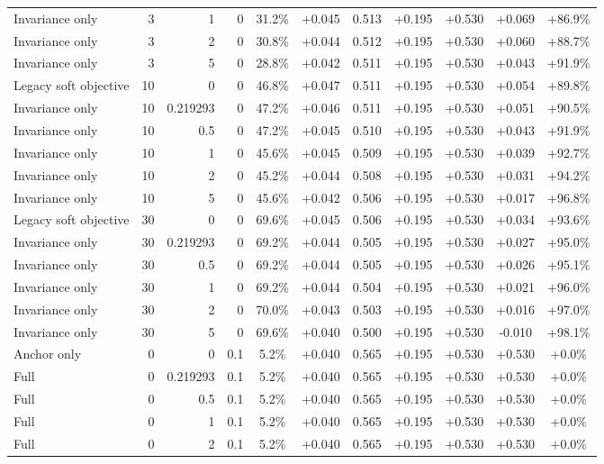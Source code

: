 \begin{table}[htbp]
\begin{tabular}{lrrrccccccc}
Invariance only & 3 & 1 & 0 & 31.2\% & +0.045 & 0.513 & +0.195 & +0.530 & +0.069 & +86.9\% \\
Invariance only & 3 & 2 & 0 & 30.8\% & +0.044 & 0.512 & +0.195 & +0.530 & +0.060 & +88.7\% \\
Invariance only & 3 & 5 & 0 & 28.8\% & +0.042 & 0.511 & +0.195 & +0.530 & +0.043 & +91.9\% \\
Legacy soft objective & 10 & 0 & 0 & 46.8\% & +0.047 & 0.511 & +0.195 & +0.530 & +0.054 & +89.8\% \\
Invariance only & 10 & 0.219293 & 0 & 47.2\% & +0.046 & 0.511 & +0.195 & +0.530 & +0.051 & +90.5\% \\
Invariance only & 10 & 0.5 & 0 & 47.2\% & +0.045 & 0.510 & +0.195 & +0.530 & +0.043 & +91.9\% \\
Invariance only & 10 & 1 & 0 & 45.6\% & +0.045 & 0.509 & +0.195 & +0.530 & +0.039 & +92.7\% \\
Invariance only & 10 & 2 & 0 & 45.2\% & +0.044 & 0.508 & +0.195 & +0.530 & +0.031 & +94.2\% \\
Invariance only & 10 & 5 & 0 & 45.6\% & +0.042 & 0.506 & +0.195 & +0.530 & +0.017 & +96.8\% \\
Legacy soft objective & 30 & 0 & 0 & 69.6\% & +0.045 & 0.506 & +0.195 & +0.530 & +0.034 & +93.6\% \\
Invariance only & 30 & 0.219293 & 0 & 69.2\% & +0.044 & 0.505 & +0.195 & +0.530 & +0.027 & +95.0\% \\
Invariance only & 30 & 0.5 & 0 & 69.2\% & +0.044 & 0.505 & +0.195 & +0.530 & +0.026 & +95.1\% \\
Invariance only & 30 & 1 & 0 & 69.2\% & +0.044 & 0.504 & +0.195 & +0.530 & +0.021 & +96.0\% \\
Invariance only & 30 & 2 & 0 & 70.0\% & +0.043 & 0.503 & +0.195 & +0.530 & +0.016 & +97.0\% \\
Invariance only & 30 & 5 & 0 & 69.6\% & +0.040 & 0.500 & +0.195 & +0.530 & -0.010 & +98.1\% \\
Anchor only & 0 & 0 & 0.1 & 5.2\% & +0.040 & 0.565 & +0.195 & +0.530 & +0.530 & +0.0\% \\
Full & 0 & 0.219293 & 0.1 & 5.2\% & +0.040 & 0.565 & +0.195 & +0.530 & +0.530 & +0.0\% \\
Full & 0 & 0.5 & 0.1 & 5.2\% & +0.040 & 0.565 & +0.195 & +0.530 & +0.530 & +0.0\% \\
Full & 0 & 1 & 0.1 & 5.2\% & +0.040 & 0.565 & +0.195 & +0.530 & +0.530 & +0.0\% \\
Full & 0 & 2 & 0.1 & 5.2\% & +0.040 & 0.565 & +0.195 & +0.530 & +0.530 & +0.0\% \\

\end{tabular}
\end{table}
